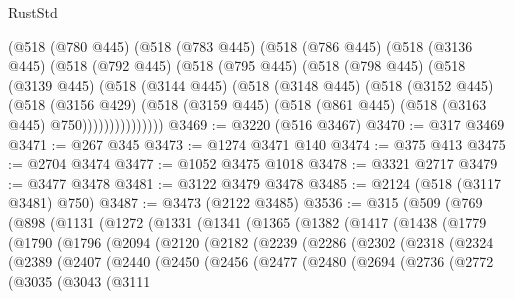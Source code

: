 \begin{lexlean}{RustStd}
\begin{coremodule}
    (@518
      (@780 @445)
      (@518
        (@783 @445)
        (@518
          (@786 @445)
          (@518
            (@3136 @445)
            (@518
              (@792 @445)
              (@518
                (@795 @445)
                (@518
                  (@798 @445)
                  (@518
                    (@3139 @445)
                    (@518
                      (@3144 @445)
                      (@518
                        (@3148 @445)
                        (@518
                          (@3152 @445)
                          (@518
                            (@3156 @429)
                            (@518
                              (@3159 @445)
                              (@518 (@861 @445) (@518 (@3163 @445) @750)))))))))))))))
@3469 := @3220 (@516 @3467)
@3470 := @317 @3469
@3471 := @267 @345
@3473 := @1274 @3471 @140
@3474 := @375 @413
@3475 := @2704 @3474
@3477 := @1052 @3475 @1018
@3478 := @3321 @2717
@3479 := @3477 @3478
@3481 := @3122 @3479 @3478
@3485 := @2124 (@518 (@3117 @3481) @750)
@3487 := @3473 (@2122 @3485)
@3536 := @315
    (@509
      (@769
        (@898
          (@1131
            (@1272
              (@1331
                (@1341
                  (@1365
                    (@1382
                      (@1417
                        (@1438
                          (@1779
                            (@1790
                              (@1796
                                (@2094
                                  (@2120
                                    (@2182
                                      (@2239
                                        (@2286
                                          (@2302
                                            (@2318
                                              (@2324
                                                (@2389
                                                  (@2407
                                                    (@2440
                                                      (@2450
                                                        (@2456
                                                          (@2477
                                                            (@2480
                                                              (@2694
                                                                (@2736
                                                                  (@2772
                                                                    (@3035
                                                                      (@3043
                                                                        (@3111

\end{coremodule}
\end{lexlean}
